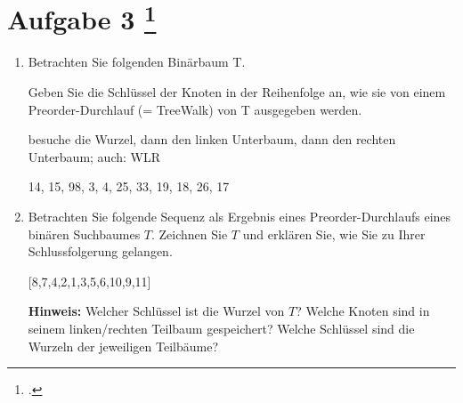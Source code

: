 \documentclass{lehramt-informatik-aufgabe}
\begin{document}
\section{Aufgabe 3
\footcite{66115:2021:03}}

\begin{enumerate}
\item Betrachten Sie folgenden Binärbaum T.

Geben Sie die Schlüssel der Knoten in der Reihenfolge an, wie sie von
einem Preorder-Durchlauf (= TreeWalk) von T ausgegeben werden.

\begin{center}
\end{center}

\begin{liExkurs}

besuche die Wurzel, dann den linken Unterbaum, dann den rechten
Unterbaum; auch: WLR

\end{liExkurs}

\begin{liAntwort}
14, 15, 98, 3, 4, 25, 33, 19, 18, 26, 17
\end{liAntwort}

\item Betrachten Sie folgende Sequenz als Ergebnis eines
Preorder-Durchlaufs eines binären Suchbaumes $T$. Zeichnen Sie $T$ und
erklären Sie, wie Sie zu Ihrer Schlussfolgerung gelangen.

\begin{center}
[8,7,4,2,1,3,5,6,10,9,11]
\end{center}

\textbf{Hinweis:} Welcher Schlüssel ist die Wurzel von $T$? Welche
Knoten sind in seinem linken/rechten Teilbaum gespeichert? Welche
Schlüssel sind die Wurzeln der jeweiligen Teilbäume?

\begin{liAntwort}
\begin{center}
\end{center}
\end{liAntwort}


\end{enumerate}
\end{document}
